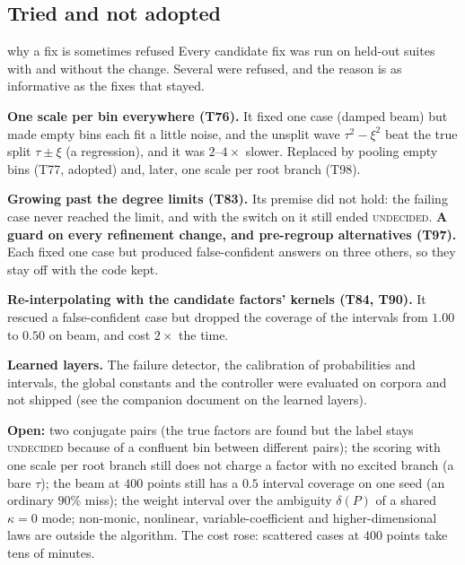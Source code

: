 \documentclass[11pt,a4paper]{article}
\theoremstyle{definition}
\begin{document}
\subsection{Tried and not adopted}
\begin{explained}{why a fix is sometimes refused}
Every candidate fix was run on held-out suites with and without the change. Several were refused, and the reason is as informative as the fixes that stayed.

\medskip\textbf{One scale per bin everywhere (T76).} It fixed one case (damped beam) but made empty bins each fit a little noise, and the unsplit wave $\tau^2-\xi^2$ beat the true split $\tau\pm\xi$ (a regression), and it was $2$--$4\times$ slower. Replaced by pooling empty bins (T77, adopted) and, later, one scale per root branch (T98).

\medskip\textbf{Growing past the degree limits (T83).} Its premise did not hold: the failing case never reached the limit, and with the switch on it still ended \textsc{undecided}. \textbf{A guard on every refinement change, and pre-regroup alternatives (T97).} Each fixed one case but produced false-confident answers on three others, so they stay off with the code kept.

\medskip\textbf{Re-interpolating with the candidate factors' kernels (T84, T90).} It rescued a false-confident case but dropped the coverage of the intervals from $1.00$ to $0.50$ on beam, and cost $2\times$ the time.

\medskip\textbf{Learned layers.} The failure detector, the calibration of probabilities and intervals, the global constants and the controller were evaluated on corpora and not shipped (see the companion document on the learned layers).
\end{explained}

\begin{caution}[title=What the fixes did not close]
\textbf{Open:} two conjugate pairs (the true factors are found but the label stays \textsc{undecided} because of a confluent bin between different pairs); the scoring with one scale per root branch still does not charge a factor with no excited branch (a bare $\tau$); the beam at $400$ points still has a $0.5$ interval coverage on one seed (an ordinary $90\%$ miss); the weight interval over the ambiguity $\delta(P)$ of a shared $\kappa=0$ mode; non-monic, nonlinear, variable-coefficient and higher-dimensional laws are outside the algorithm. The cost rose: scattered cases at $400$ points take tens of minutes.
\end{caution}
\end{document}
